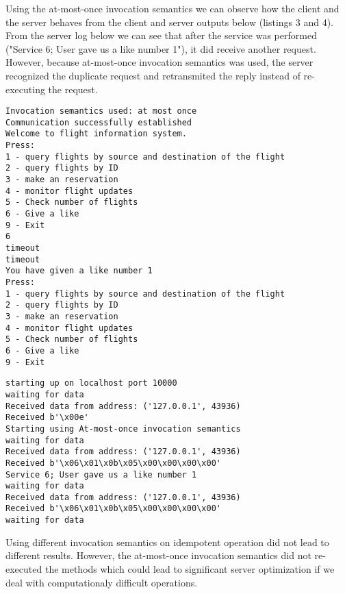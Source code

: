 \documentclass[12pt,a4paper]{article}
\begin{document}
Using the at-most-once invocation semantics we can observe how the client and the server behaves from the client and server outputs below (listings 3 and 4). From the server log below we can see that after the service was performed ("Service 6; User gave us a like number 1"), it did receive another request. However, because at-most-once invocation semantics was used, the server recognized the duplicate request and retransmited the reply instead of re-executing the request.
\begin{lstlisting}[caption={Client console output},xleftmargin=.03\textwidth]
Invocation semantics used: at most once
Communication successfully established
Welcome to flight information system.
Press:
1 - query flights by source and destination of the flight
2 - query flights by ID
3 - make an reservation
4 - monitor flight updates
5 - Check number of flights
6 - Give a like
9 - Exit
6
timeout
timeout
You have given a like number 1
Press:
1 - query flights by source and destination of the flight
2 - query flights by ID
3 - make an reservation
4 - monitor flight updates
5 - Check number of flights
6 - Give a like
9 - Exit
\end{lstlisting}

\begin{lstlisting}[caption={Server console output},xleftmargin=.03\textwidth]
starting up on localhost port 10000
waiting for data
Received data from address: ('127.0.0.1', 43936)
Received b'\x00e'
Starting using At-most-once invocation semantics
waiting for data
Received data from address: ('127.0.0.1', 43936)
Received b'\x06\x01\x0b\x05\x00\x00\x00\x00'
Service 6; User gave us a like number 1
waiting for data
Received data from address: ('127.0.0.1', 43936)
Received b'\x06\x01\x0b\x05\x00\x00\x00\x00'
waiting for data
\end{lstlisting}
Using different invocation semantics on idempotent operation did not lead to different results. However, the at-most-once invocation semantics did not re-executed the methods which could lead to significant server optimization if we deal with computationaly difficult operations. 
\end{document}
